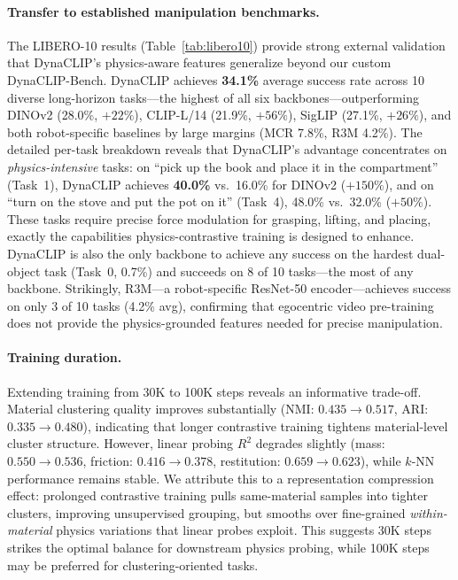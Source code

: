 \documentclass{article}
\newcommand{\methodname}{DynaCLIP}
\begin{document}
\paragraph{Transfer to established manipulation benchmarks.}
The LIBERO-10 results (Table~\ref{tab:libero10}) provide strong external validation that \methodname{}'s physics-aware features generalize beyond our custom DynaCLIP-Bench. \methodname{} achieves \textbf{34.1\%} average success rate across 10 diverse long-horizon tasks---the highest of all six backbones---outperforming DINOv2 (28.0\%, $+22\%$), CLIP-L/14 (21.9\%, $+56\%$), SigLIP (27.1\%, $+26\%$), and both robot-specific baselines by large margins (MCR 7.8\%, R3M 4.2\%). The detailed per-task breakdown reveals that \methodname{}'s advantage concentrates on \emph{physics-intensive} tasks: on ``pick up the book and place it in the compartment'' (Task~1), \methodname{} achieves \textbf{40.0\%} vs.\ 16.0\% for DINOv2 ($+150\%$), and on ``turn on the stove and put the pot on it'' (Task~4), 48.0\% vs.\ 32.0\% ($+50\%$). These tasks require precise force modulation for grasping, lifting, and placing, exactly the capabilities physics-contrastive training is designed to enhance. \methodname{} is also the only backbone to achieve any success on the hardest dual-object task (Task~0, 0.7\%) and succeeds on 8 of 10 tasks---the most of any backbone. Strikingly, R3M---a robot-specific ResNet-50 encoder---achieves success on only 3 of 10 tasks (4.2\% avg), confirming that egocentric video pre-training does not provide the physics-grounded features needed for precise manipulation.

\paragraph{Training duration.}
Extending training from 30K to 100K steps reveals an informative trade-off. Material clustering quality improves substantially (NMI: $0.435 \to 0.517$, ARI: $0.335 \to 0.480$), indicating that longer contrastive training tightens material-level cluster structure. However, linear probing $R^2$ degrades slightly (mass: $0.550 \to 0.536$, friction: $0.416 \to 0.378$, restitution: $0.659 \to 0.623$), while $k$-NN performance remains stable. We attribute this to a representation compression effect: prolonged contrastive training pulls same-material samples into tighter clusters, improving unsupervised grouping, but smooths over fine-grained \emph{within-material} physics variations that linear probes exploit. This suggests 30K steps strikes the optimal balance for downstream physics probing, while 100K steps may be preferred for clustering-oriented tasks.
\end{document}
